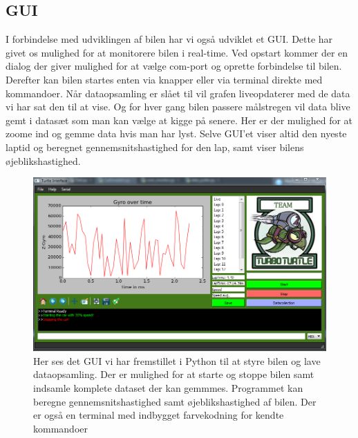 \subsection{GUI}
I forbindelse med udviklingen af bilen har vi også udviklet et GUI. Dette har givet os mulighed for at monitorere bilen i real-time. Ved opstart kommer der en dialog der giver mulighed for at vælge com-port og oprette forbindelse til bilen. Derefter kan bilen startes enten via knapper eller via terminal direkte med kommandoer. Når dataopsamling er slået til vil grafen liveopdaterer med de data vi har sat den til at vise. Og for hver gang bilen passere målstregen vil data blive gemt i datasæt som man kan vælge at kigge på senere. Her er der mulighed for at zoome ind og gemme data hvis man har lyst. Selve GUI'et viser altid den nyeste laptid og beregnet gennemsnitshastighed for den lap, samt viser bilens øjeblikshastighed.

\begin{figure}[h]
	\centering
		\includegraphics[scale=0.60]{Billeder/Application.PNG}
	\caption{Her ses det GUI vi har fremstillet i Python til at styre bilen og lave dataopsamling. Der er mulighed for at 				starte og stoppe bilen samt indsamle komplete dataset der kan gemmmes. Programmet kan beregne gennemsnitshastighed 				samt øjeblikshastighed af bilen. Der er også en terminal med indbygget farvekodning for kendte kommandoer}
	\label{fig:Application}
\end{figure}

